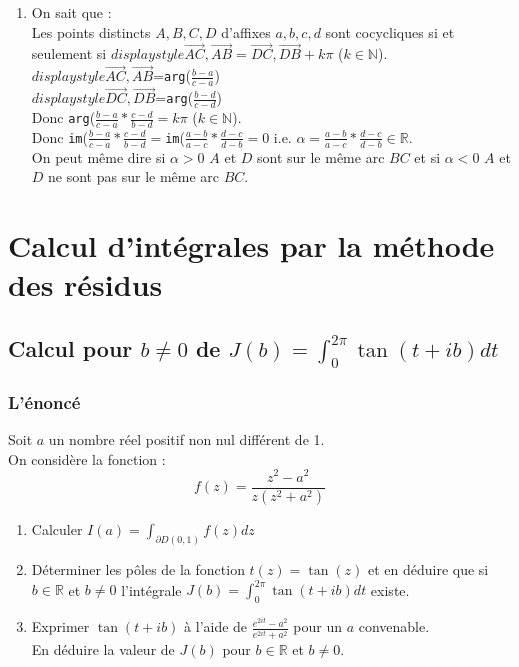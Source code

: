 \documentclass[a4paper,11pt]{book}
\newcommand{\R}{{\mathbb{R}}}
\newcommand{\N}{{\mathbb{N}}}
\begin{document}
\begin{enumerate}
{\tt simplify(eq12/eq13)}\\
On obtient :\\
{\tt -1}\\
Donc les 2 relations {\tt eq12=0} et {\tt eq13=0} sont donc \'equivalentes.
\item On sait que :\\
Les points distincts $A,B,C,D$ d'affixes $a,b,c,d$ sont cocycliques si et 
seulement si $displaystyle \overrightarrow{AC},\overrightarrow{AB}=\overrightarrow{DC},\overrightarrow{DB}+k\pi$ ($k\in \N$).\\
 $displaystyle \overrightarrow{AC},\overrightarrow{AB}$={\tt arg}($\frac{b-a}{c-a}$)\\
 $displaystyle \overrightarrow{DC},\overrightarrow{DB}$={\tt arg}($\frac{b-d}{c-d}$)\\
Donc {\tt arg}($\frac{b-a}{c-a}*\frac{c-d}{b-d}=k\pi$ ($k\in \N$).\\
Donc {\tt im}($\frac{b-a}{c-a}*\frac{c-d}{b-d}=${\tt im}($\frac{a-b}{a-c}*\frac{d-c}{d-b}=0$ i.e.
$\alpha=\frac{a-b}{a-c}*\frac{d-c}{d-b} \in \R$.\\
On peut m\^eme dire si $\alpha>0$ $A$ et $D$ sont sur le m\^eme arc $BC$ et 
si $\alpha<0$ $A$ et $D$ ne sont pas sur le m\^eme arc $BC$.
\end{enumerate}

\chapter{Calcul d'int\'egrales par la m\'ethode des r\'esidus}
\section{Calcul pour $b\neq 0$ de $J(b)=\int_0^{2\pi}\tan(t+ib)dt$}
\subsection{L'\'enonc\'e}
Soit $a$ un nombre r\'eel positif non nul diff\'erent de 1.\\
On consid\`ere la fonction :
$$f(z)=\frac{z^2-a^2}{z(z^2+a^2)}$$
\begin{enumerate}
\item Calculer $\displaystyle I(a)=\int_{\partial D(0,1)} f(z)dz$
\item D\'eterminer les p\^oles de la fonction $t(z)=\tan(z)$ et en d\'eduire 
que si $b\in \R$ et $b\neq 0$ l'int\'egrale 
$\displaystyle J(b)=\int_0^{2\pi}\tan(t+ib)dt$ existe.
\item Exprimer $\tan(t+ib)$ \`a l'aide de $\displaystyle \frac{e^{2it}-a^2}{e^{2it}+a^2}$ pour un $a$ convenable.\\
En d\'eduire la valeur de $J(b)$ pour $b\in \R$ et $b\neq 0$.
\end{enumerate}
\end{document}

